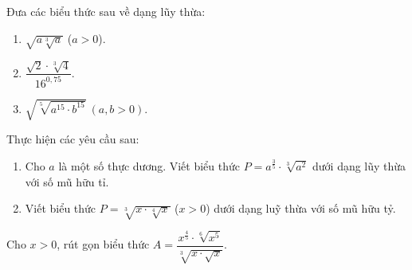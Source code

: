 \begin{bt}%
	 Đưa các biểu thức sau về dạng lũy thừa:
	\begin{enumerate}
		\item $\sqrt{a\sqrt[3]a}$ ($a>0$). 
		\item  $\dfrac{\sqrt{2}\cdot\sqrt[3]4}{16^{0{,}75}}$.
		 \item $\sqrt{\sqrt[5]{a^{15}\cdot b^{15}}}~(a,b>0)$.
	\end{enumerate}
\end{bt}

\begin{bt}%
	 Thực hiện các yêu cầu sau:
	\begin{enumerate}
		\item Cho $a$ là một số thực dương. Viết biểu thức $P=a^{\frac{3}{5}} \cdot \sqrt[3]{a^2}$ dưới dạng lũy  thừa với số mũ hữu tỉ.
		\item  Viết biểu thức $P=\sqrt[3]{x \cdot \sqrt[4]{x}}$ ($x>0$) dưới dạng luỹ thừa với số mũ hữu tỷ.
	\end{enumerate}
\end{bt}

\begin{bt}%
	Cho  $x>0$, rút gọn biểu thức $A=\dfrac{x^{\tfrac{4}{5}} \cdot \sqrt[6]{x^5}}{\sqrt[3]{x \cdot \sqrt{x}}}$.
\end{bt}

